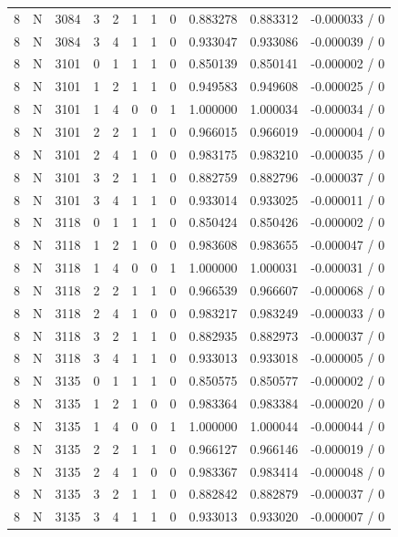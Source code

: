 \begin{longtable}{@{}rlrrlrrrrrr@{}}
8 & N & 3084 & 3 & 2 & 1 & 1 & 0 & 0.883278 & 0.883312 & -0.000033 / 0 \\
8 & N & 3084 & 3 & 4 & 1 & 1 & 0 & 0.933047 & 0.933086 & -0.000039 / 0 \\
8 & N & 3101 & 0 & 1 & 1 & 1 & 0 & 0.850139 & 0.850141 & -0.000002 / 0 \\
8 & N & 3101 & 1 & 2 & 1 & 1 & 0 & 0.949583 & 0.949608 & -0.000025 / 0 \\
8 & N & 3101 & 1 & 4 & 0 & 0 & 1 & 1.000000 & 1.000034 & -0.000034 / 0 \\
8 & N & 3101 & 2 & 2 & 1 & 1 & 0 & 0.966015 & 0.966019 & -0.000004 / 0 \\
8 & N & 3101 & 2 & 4 & 1 & 0 & 0 & 0.983175 & 0.983210 & -0.000035 / 0 \\
8 & N & 3101 & 3 & 2 & 1 & 1 & 0 & 0.882759 & 0.882796 & -0.000037 / 0 \\
8 & N & 3101 & 3 & 4 & 1 & 1 & 0 & 0.933014 & 0.933025 & -0.000011 / 0 \\
8 & N & 3118 & 0 & 1 & 1 & 1 & 0 & 0.850424 & 0.850426 & -0.000002 / 0 \\
8 & N & 3118 & 1 & 2 & 1 & 0 & 0 & 0.983608 & 0.983655 & -0.000047 / 0 \\
8 & N & 3118 & 1 & 4 & 0 & 0 & 1 & 1.000000 & 1.000031 & -0.000031 / 0 \\
8 & N & 3118 & 2 & 2 & 1 & 1 & 0 & 0.966539 & 0.966607 & -0.000068 / 0 \\
8 & N & 3118 & 2 & 4 & 1 & 0 & 0 & 0.983217 & 0.983249 & -0.000033 / 0 \\
8 & N & 3118 & 3 & 2 & 1 & 1 & 0 & 0.882935 & 0.882973 & -0.000037 / 0 \\
8 & N & 3118 & 3 & 4 & 1 & 1 & 0 & 0.933013 & 0.933018 & -0.000005 / 0 \\
8 & N & 3135 & 0 & 1 & 1 & 1 & 0 & 0.850575 & 0.850577 & -0.000002 / 0 \\
8 & N & 3135 & 1 & 2 & 1 & 0 & 0 & 0.983364 & 0.983384 & -0.000020 / 0 \\
8 & N & 3135 & 1 & 4 & 0 & 0 & 1 & 1.000000 & 1.000044 & -0.000044 / 0 \\
8 & N & 3135 & 2 & 2 & 1 & 1 & 0 & 0.966127 & 0.966146 & -0.000019 / 0 \\
8 & N & 3135 & 2 & 4 & 1 & 0 & 0 & 0.983367 & 0.983414 & -0.000048 / 0 \\
8 & N & 3135 & 3 & 2 & 1 & 1 & 0 & 0.882842 & 0.882879 & -0.000037 / 0 \\
8 & N & 3135 & 3 & 4 & 1 & 1 & 0 & 0.933013 & 0.933020 & -0.000007 / 0 \\

\end{longtable}
